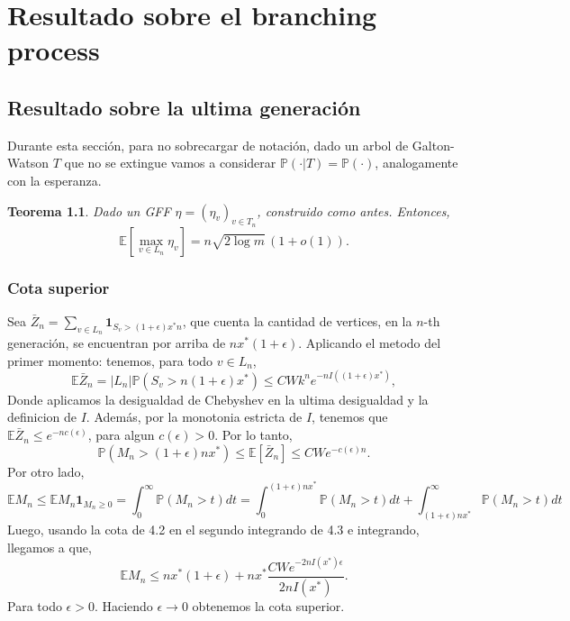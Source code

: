 \documentclass[12pt]{report}
\newtheorem{theorem}{Teorema}  %
\begin{document}
\chapter{Resultado sobre el branching process}
\section{Resultado sobre la ultima generación}
Durante esta sección, para no sobrecargar de notación, dado un arbol de Galton-Watson $T$ que no se extingue 
vamos a considerar $\mathbb{P}(\cdot|T) = \mathbb{P}(\cdot)$, analogamente con la esperanza.
\begin{theorem}
Dado un GFF $\eta = (\eta_{v})_{v \in T_{n}}$, construido como antes. Entonces,
\begin{equation} 
\mathbb{E}[\max_{v \in L_n} \eta_v] = n\sqrt{2\log m} \, (1 + o(1)).
\end{equation}
\end{theorem}

\subsection{Cota superior}

Sea $\bar{Z}_n = \sum_{v \in L_n} \mathbf{1}_{S_v > (1 + \epsilon)x^* n}$, 
que cuenta la cantidad de vertices, en la $n$-th generación, 
se encuentran por arriba de $n x^*(1 + \epsilon)$. Aplicando el metodo del primer momento: 
tenemos, para todo $v \in L_n$,
\[
\mathbb{E} \bar{Z}_n = |L_n| \mathbb{P}(S_v > n(1 + \epsilon)x^*) \leq CW k^n e^{-n I((1 + \epsilon)x^*)},
\]
Donde aplicamos la desigualdad de Chebyshev en la ultima desigualdad y la definicion de $I$. Además, por 
la monotonia estricta de $I$, tenemos que $\mathbb{E} \bar{Z}_n \leq e^{-n c(\epsilon)}$, 
para algun $c(\epsilon) > 0$. Por lo tanto,
\begin{equation}
\mathbb{P}(M_n > (1 + \epsilon) n x^*) \leq \mathbb{E} [\bar{Z}_n] \leq CWe^{-c(\epsilon)n}.
\end{equation}
Por otro lado,
\begin{equation}
\mathbb{E}M_n \leq \mathbb{E}M_n\mathbf{1}_{M_n \geq 0} = \int_{0}^{\infty} \mathbb{P}(M_n > t) dt = 
\int_{0}^{(1+\epsilon)nx^*} \mathbb{P}(M_n > t) dt + \int_{(1+\epsilon)nx^*}^{\infty} \mathbb{P}(M_n > t) dt 
\end{equation}
Luego, usando la cota de 4.2 en el segundo integrando de 4.3 e integrando, llegamos a que,
\begin{equation}
\mathbb{E}M_n \leq nx^*(1+\epsilon) + nx^* \frac{CWe^{-2nI(x^*)\epsilon}}{2nI(x^*)}.
\end{equation}
Para todo $\epsilon > 0$. Haciendo $\epsilon \to 0$ obtenemos la cota superior.
\end{document}
